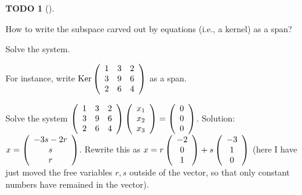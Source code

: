 \documentclass[numbers=enddot,12pt,final,onecolumn,notitlepage]{scrartcl}%
\theoremstyle{definition}
\newtheorem{quest}[theo]{TODO}
\newenvironment{todo}[1][]
{\begin{quest}[#1]\begin{leftbar}}
{\end{leftbar}\end{quest}}
\begin{document}
\begin{todo}
How to write the subspace carved out by equations (i.e., a kernel) as a span?

Solve the system.

For instance, write $\operatorname*{Ker}\left(
\begin{array}
[c]{ccc}%
1 & 3 & 2\\
3 & 9 & 6\\
2 & 6 & 4
\end{array}
\right)  $ as a span.

Solve the system $\left(
\begin{array}
[c]{ccc}%
1 & 3 & 2\\
3 & 9 & 6\\
2 & 6 & 4
\end{array}
\right)  \left(
\begin{array}
[c]{c}%
x_{1}\\
x_{2}\\
x_{3}%
\end{array}
\right)  =\left(
\begin{array}
[c]{c}%
0\\
0\\
0
\end{array}
\right)  $. Solution: $x=\left(
\begin{array}
[c]{c}%
-3s-2r\\
s\\
r
\end{array}
\right)  $. Rewrite this as $x=r\left(
\begin{array}
[c]{c}%
-2\\
0\\
1
\end{array}
\right)  +s\left(
\begin{array}
[c]{c}%
-3\\
1\\
0
\end{array}
\right)  $ (here I have just moved the free variables $r,s$ outside of the
vector, so that only constant numbers have remained in the vector).


\end{todo}
\end{document}
